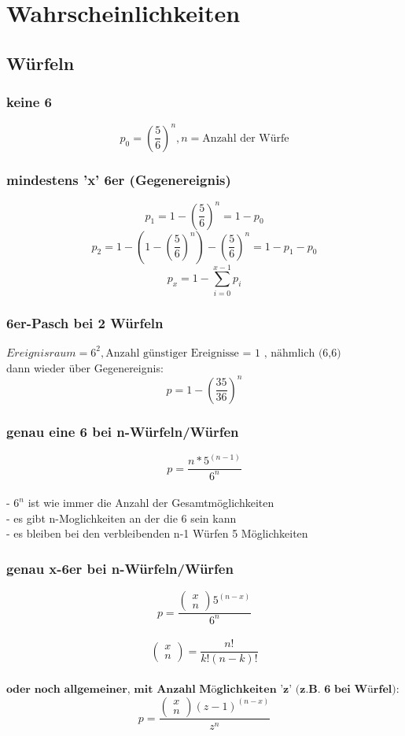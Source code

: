\documentclass{article}
\begin{document}
\section{Wahrscheinlichkeiten}
\subsection{W\"urfeln}
\subsubsection{keine 6}
\[
	p_0 = \left( \frac{5}{6} \right)^n , n = \text{Anzahl der W\"urfe}
\]
\subsubsection{mindestens 'x' 6er (Gegenereignis)}
\[	
	p_1 = 1 - \left( \frac{5}{6} \right)^n = 1 - p_0
\]	
\[		
	p_2 = 1-\left(1 - \left( \frac{5}{6} \right)^n\right)-\left( \frac{5}{6} \right)^n = 1-p_1 -p_0
\]
\[
	p_x = 1 - \sum_{i=0}^{x-1} p_i
\]
\subsubsection{6er-Pasch bei 2 W\"urfeln}
$Ereignisraum = 6^2 , \text{Anzahl g\"unstiger Ereignisse = 1 , n\"ahmlich (6,6)}$\\
dann wieder \"uber Gegenereignis: \\
\[ p=1-\left(\frac{35}{36}\right)^n \]
\subsubsection{genau eine 6 bei n-W\"urfeln/W\"urfen}
\[ p= \frac{n*5^{(n-1)}}{6^n}\]\\
- $6^n $ ist wie immer die Anzahl der Gesamtm\"oglichkeiten \\
- es gibt n-Moglichkeiten an der die 6 sein kann \\
- es bleiben bei den verbleibenden n-1 W\"urfen 5 M\"oglichkeiten
\subsubsection{genau x-6er bei n-W\"urfeln/W\"urfen}
\[ p= \frac{\begin{pmatrix}
			x\\n
\end{pmatrix}5^{(n-x)}}{6^n}\]\\
\[\begin{pmatrix}
		x\\n
	\end{pmatrix}= \frac{n!}{k!(n-k)!}
\]\\
$\textbf{oder noch allgemeiner, mit Anzahl M\"oglichkeiten 'z' (z.B. 6 bei W\"urfel):}$\[
	p= \frac{\begin{pmatrix}
			x\\n
	\end{pmatrix}(z-1)^{(n-x)}}{z^n}
\]
\end{document}
